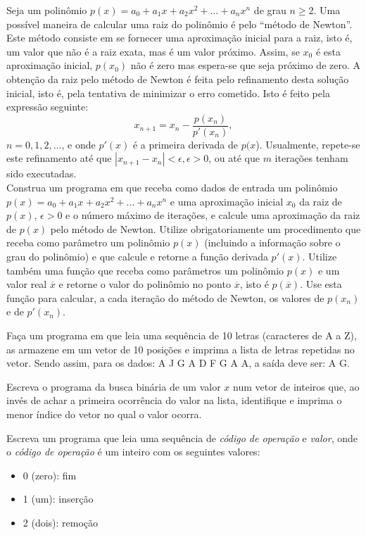 \item Seja um polinômio $p(x)= a_0 + a_1 x + a_2 x^2 + \ldots + a_n x^n$ de
  grau $n \ge 2$. Uma possível maneira de calcular uma raiz do polinômio
  é pelo ``método de Newton''. Este método consiste em se fornecer uma
  aproximação inicial para a raiz, isto é, um valor que não é a raiz
  exata, mas é um valor próximo.  Assim, se $x_0$ é esta
  aproximação inicial, $p(x_0)$ não é zero mas espera-se que
  seja próximo de zero.  A obtenção da raiz pelo método de Newton é
  feita pelo refinamento desta solução inicial, isto é, pela tentativa
  de minimizar o erro cometido. Isto é feito pela expressão seguinte:
\[x_{n+1}=x_{n}-\frac{p(x_{n})}{p\prime(x_{n})},\]  $n=0,1,2,\ldots$,  e
  onde $p\prime(x)$ é a primeira derivada de $p(x$). Usualmente, repete-se
  este refinamento até que $|x_{n+1}-x_{n}| < \epsilon, \epsilon>0$, ou
  até que $m$ iterações tenham sido executadas. \\
  Construa um programa em  que receba como dados de entrada 
  um polinômio $p(x)= a_0 + a_1 x + a_2 x^2 + \ldots + a_n x^n$ e
  uma  aproximação inicial  $x_0$ da  raiz de  $p(x)$, $\epsilon>0$  e o
  número  máximo de  iterações, e  calcule  uma aproximação  da raiz  de
  $p(x)$ pelo método de Newton. Utilize obrigatoriamente um procedimento
  que receba como parâmetro  um polinômio $p(x)$ (incluindo a informação
  sobre o grau do polinômio) e que calcule e retorne a função
  derivada  $p\prime(x)$.  Utilize também  uma  função  que receba  como
  parâmetros um polinômio $p(x)$ e um valor real $\overline{x}$ e retorne
  o   valor    do   polinômio    no   ponto   $\overline{x}$,    isto   é
  $p(\overline{x})$. Use  esta função para  calcular, a cada  iteração do
  método    de    Newton,    os    valores   de    $p(x_{n})$    e    de
  $p\prime(x_{n})$.  

\item Faça um programa em  que leia uma sequência de 10 
     letras (caracteres de A a Z), as armazene em um vetor de 10 posições 
     e imprima a lista de letras repetidas no vetor. Sendo assim, para os 
     dados: A J G A D F G A A, a saída deve ser: A G.

\item Escreva o programa da busca binária de um valor $x$ num 
     vetor de inteiros que, ao invés de achar a primeira ocorrência do valor 
     na lista, identifique e imprima o menor índice do vetor no qual o valor 
     ocorra.

\item Escreva um programa que leia uma sequência de {\em código de
operação} e {\em valor}, onde o {\em código de operação} é um inteiro com
os seguintes valores:
\begin{itemize}
\item 0 (zero): fim
\item 1 (um): inserção
\item 2 (dois): remoção
\end{itemize} 


